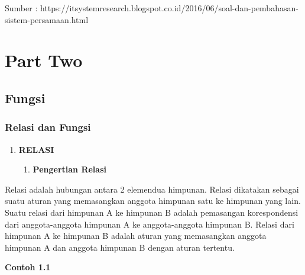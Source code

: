 \documentclass[11pt,fleqn]{book} %
\begin{document}
\noindent Sumber : https://itsystemresearch.blogspot.co.id/2016/06/soal-dan-pembahasan-sistem-persamaan.html\textbf{}

\noindent 




\part{Part Two}



\chapter{Fungsi}

\section{Relasi dan Fungsi}

\begin{enumerate}
\item \textbf{ RELASI}

\begin{enumerate}
\item \textbf{ Pengertian Relasi}
\end{enumerate}
\end{enumerate}

\noindent 

 Relasi adalah hubungan antara 2 elemendua himpunan. Relasi dikatakan sebagai suatu aturan yang memasangkan anggota himpunan satu ke himpunan yang lain. Suatu relasi dari himpunan A ke himpunan B adalah pemasangan korespondensi dari anggota-anggota himpunan A ke anggota-anggota himpunan B. Relasi dari himpunan A ke himpunan B adalah aturan yang memasangkan anggota himpunan A dan anggota himpunan B dengan aturan tertentu.

\noindent 

\noindent \textbf{Contoh 1.1}
\end{document}
